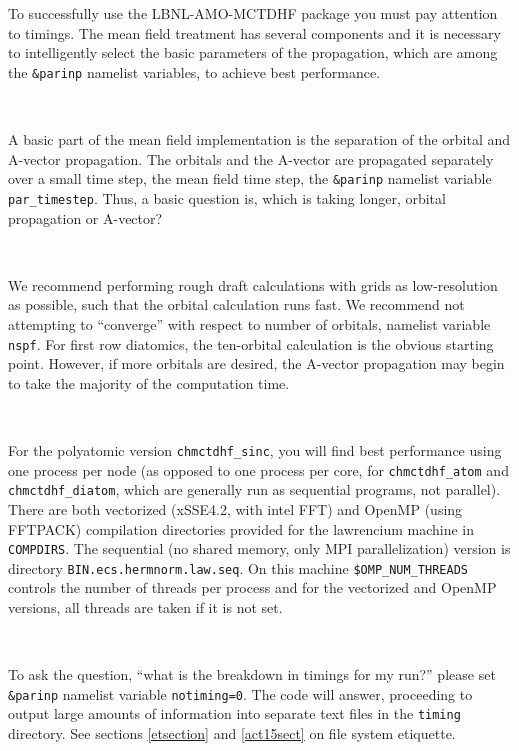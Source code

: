 \documentclass[10pt,leqno, oneside]{book}
\begin{document}
To successfully use the LBNL-AMO-MCTDHF package you must pay attention to timings.  The mean field treatment has
several components and it is necessary to intelligently select the basic parameters of the propagation, which are among
the \verb#&parinp# namelist variables, to achieve best performance.

\

A basic part of the mean field implementation is the separation of the orbital and A-vector propagation.  The orbitals
and the A-vector are propagated separately over a small time step, the mean field time step, the \verb#&parinp# namelist
variable \verb#par_timestep#.  Thus, a basic question is, which is taking longer, orbital propagation or A-vector?

\

We recommend performing rough draft calculations with grids as low-resolution as possible, such that the orbital calculation
runs fast.  We recommend not attempting to ``converge'' with respect to number of orbitals, namelist variable \verb#nspf#.
For first row diatomics, the ten-orbital calculation is the obvious starting point.  However, if more orbitals are desired, the
A-vector propagation may begin to take the majority of the computation time.

\

For the polyatomic version \verb#chmctdhf_sinc#, you will find best performance using one process per node (as opposed to
one process per core, for \verb#chmctdhf_atom# and \verb#chmctdhf_diatom#, which are generally run as sequential programs,
not parallel).  There are both vectorized (xSSE4.2, with intel FFT) and OpenMP (using FFTPACK) 
compilation directories provided for the lawrencium machine in \verb#COMPDIRS#.  The sequential (no shared memory, only
MPI parallelization) version is directory \verb#BIN.ecs.hermnorm.law.seq#.  On this machine \verb#$OMP_NUM_THREADS# controls
the number of threads per process and for the vectorized and OpenMP versions, all threads are taken if it is not set.

\

To ask the question, ``what is the breakdown in timings for my run?'' please set \verb#&parinp# namelist variable \verb#notiming=0#.
The code will answer, proceeding to output large amounts of information into separate text files in the
\verb#timing# directory.  See sections \ref{etsection} and \ref{act15sect} on file system etiquette.
\end{document}
